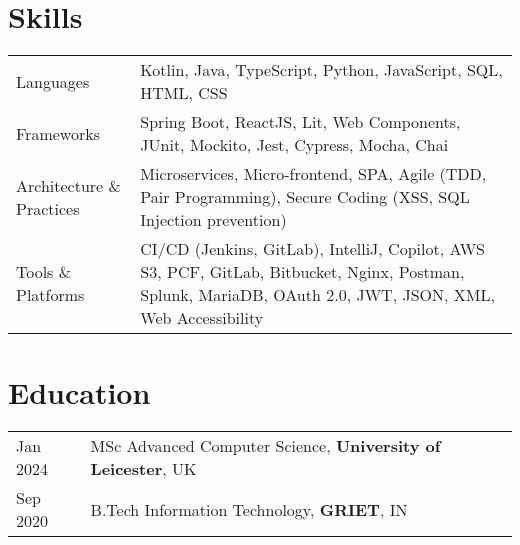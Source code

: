 \documentclass[a4paper,12pt]{article}
\begin{document}
\section{Skills}
\begin{tabularx}{\linewidth}{@{}l X@{}}
Languages & Kotlin, Java, TypeScript, Python, JavaScript, SQL, HTML, CSS \\
Frameworks & Spring Boot, ReactJS, Lit, Web Components, JUnit, Mockito, Jest, Cypress, Mocha, Chai \\
Architecture \& Practices & Microservices, Micro-frontend, SPA, Agile (TDD, Pair Programming), Secure Coding (XSS, SQL Injection prevention) \\
Tools \& Platforms & CI/CD (Jenkins, GitLab), IntelliJ, Copilot, AWS S3, PCF, GitLab, Bitbucket, Nginx, Postman, Splunk, MariaDB, OAuth 2.0, JWT, JSON, XML, Web Accessibility \\
\end{tabularx}
\section{Education}
\begin{tabularx}{\linewidth}{@{}l X@{}} 	
Jan 2024 & MSc Advanced Computer Science, \textbf{University of Leicester}, UK \\
Sep 2020 & B.Tech Information Technology, \textbf{GRIET}, IN \\
\end{tabularx}
\end{document}
